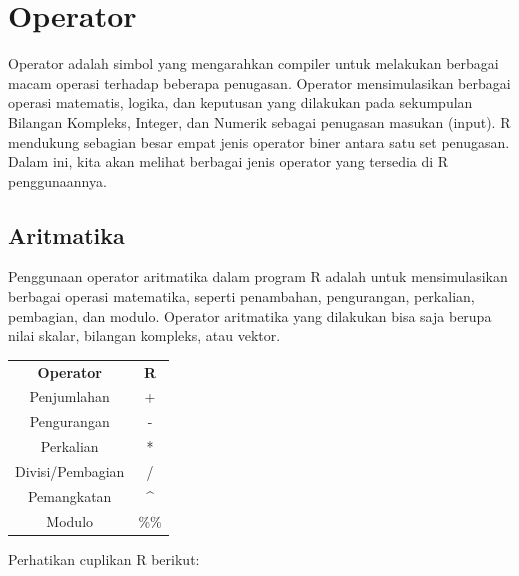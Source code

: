 \documentclass[
]{book}
\begin{document}
\hypertarget{operator}{%
\section{Operator}\label{operator}}

Operator adalah simbol yang mengarahkan compiler untuk melakukan berbagai macam operasi terhadap beberapa penugasan. Operator mensimulasikan berbagai operasi matematis, logika, dan keputusan yang dilakukan pada sekumpulan Bilangan Kompleks, Integer, dan Numerik sebagai penugasan masukan (input). R mendukung sebagian besar empat jenis operator biner antara satu set penugasan. Dalam ini, kita akan melihat berbagai jenis operator yang tersedia di R penggunaannya.

\hypertarget{aritmatika}{%
\subsection{Aritmatika}\label{aritmatika}}

Penggunaan operator aritmatika dalam program R adalah untuk mensimulasikan berbagai operasi matematika, seperti penambahan, pengurangan, perkalian, pembagian, dan modulo. Operator aritmatika yang dilakukan bisa saja berupa nilai skalar, bilangan kompleks, atau vektor.

\begin{longtable}[]{@{}cc@{}}
\toprule\noalign{}
\endhead
\bottomrule\noalign{}
\endlastfoot
\textbf{Operator} & \textbf{R} \\
Penjumlahan & + \\
Pengurangan & - \\
Perkalian & * \\
Divisi/Pembagian & / \\
Pemangkatan & \^{} \\
Modulo & \%\% \\
\end{longtable}

Perhatikan cuplikan R berikut:
\end{document}
